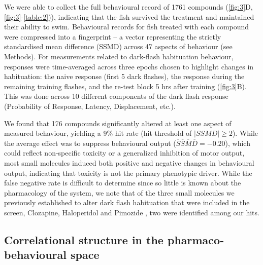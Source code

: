 \documentclass[9pt,lineno]{RandlettLab_elife}
\begin{document}
We were able to collect the full behavioural record of 1761 compounds  (\autoref{fig:3}D, \autoref{fig:3}-\autoref{table:2})), indicating that the fish survived the treatment and maintained their ability to swim. Behavioural records for fish treated with each compound were compressed into a fingerprint \citep{Rihel2010-pj} -- a vector representing the strictly standardised mean difference (SSMD) across 47 aspects of behaviour (see Methods). For measurements related to dark-flash habituation behaviour, responses were time-averaged across three epochs chosen to highlight changes in habituation: the naive response (first 5 dark flashes), the response during the remaining training flashes, and the re-test block 5 hrs after training (\autoref{fig:3}B). This was done across 10 different components of the dark flash response (Probability of Response, Latency, Displacement, etc.). 

 We found that 176 compounds significantly altered at least one aspect of measured behaviour, yielding a 9\% hit rate (hit threshold of $|SSMD| \geq 2$). While the average effect was to suppress behavioural output (\(\overline S \overline S \overline M \overline D = -0.20\)), which could reflect non-specific toxicity or a generalized inhibition of motor output, most small molecules induced both positive and negative changes in behavioural output, indicating that toxicity is not the primary phenotypic driver. While the false negative rate is difficult to determine since so little is known about the pharmacology of the system, we note that of the three small molecules we previously established to alter dark flash habituation that were included in the screen, Clozapine, Haloperidol and Pimozide \citep{Randlett2019-fi}, two were identified among our hits. 


\subsection{Correlational structure in the pharmaco-behavioural space }
\vspace{3mm}
\end{document}
